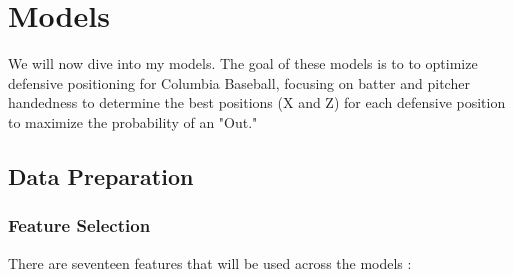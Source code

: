 \documentclass{article}
\begin{document}
\newpage
\section{Models}

We will now dive into my models. The goal of these models is to to optimize defensive positioning for Columbia Baseball, focusing on batter and pitcher handedness to determine the best positions (X and Z) for each defensive position to maximize the probability of an "Out."

\subsection{Data Preparation}
\subsubsection{Feature Selection}
There are seventeen features that will be used across the models \cite{trackman2022} \cite{trackman2023} \cite{trackman2024}:
\end{document}
